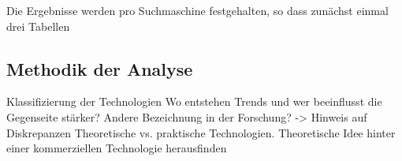 Die Ergebnisse werden pro Suchmaschine festgehalten, so dass zunächst einmal drei Tabellen

\subsection{Methodik der Analyse}
Klassifizierung der Technologien
Wo entstehen Trends und wer beeinflusst die Gegenseite stärker?
Andere Bezeichnung in der Forschung? -> Hinweis auf Diskrepanzen
Theoretische vs. praktische Technologien. Theoretische Idee hinter einer kommerziellen Technologie herausfinden